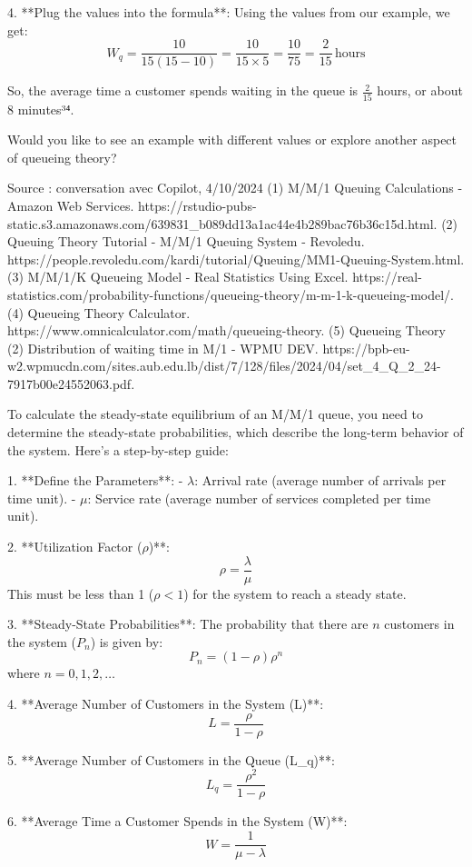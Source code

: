 4. **Plug the values into the formula**: Using the values from our example, we get:
   $$W_q = \frac{10}{15 (15 - 10)} = \frac{10}{15 \times 5} = \frac{10}{75} = \frac{2}{15} \, \text{hours}$$

So, the average time a customer spends waiting in the queue is \(\frac{2}{15}\) hours, or about 8 minutes³⁴.

Would you like to see an example with different values or explore another aspect of queueing theory?

Source : conversation avec Copilot, 4/10/2024
(1) M/M/1 Queuing Calculations - Amazon Web Services. https://rstudio-pubs-static.s3.amazonaws.com/639831_b089dd13a1ac44e4b289bac76b36c15d.html.
(2) Queuing Theory Tutorial - M/M/1 Queuing System - Revoledu. https://people.revoledu.com/kardi/tutorial/Queuing/MM1-Queuing-System.html.
(3) M/M/1/K Queueing Model - Real Statistics Using Excel. https://real-statistics.com/probability-functions/queueing-theory/m-m-1-k-queueing-model/.
(4) Queueing Theory Calculator. https://www.omnicalculator.com/math/queueing-theory.
(5) Queueing Theory (2) Distribution of waiting time in M/1 - WPMU DEV. https://bpb-eu-w2.wpmucdn.com/sites.aub.edu.lb/dist/7/128/files/2024/04/set_4_Q_2_24-7917b00e24552063.pdf.



To calculate the steady-state equilibrium of an M/M/1 queue, you need to determine the steady-state probabilities, which describe the long-term behavior of the system. Here’s a step-by-step guide:

1. **Define the Parameters**:
   - \(\lambda\): Arrival rate (average number of arrivals per time unit).
   - \(\mu\): Service rate (average number of services completed per time unit).

2. **Utilization Factor (\(\rho\))**:
   $$\rho = \frac{\lambda}{\mu}$$
   This must be less than 1 (\(\rho < 1\)) for the system to reach a steady state.

3. **Steady-State Probabilities**:
   The probability that there are \(n\) customers in the system (\(P_n\)) is given by:
   $$P_n = (1 - \rho) \rho^n$$
   where \(n = 0, 1, 2, \ldots\)

4. **Average Number of Customers in the System (L)**:
   $$L = \frac{\rho}{1 - \rho}$$

5. **Average Number of Customers in the Queue (L_q)**:
   $$L_q = \frac{\rho^2}{1 - \rho}$$

6. **Average Time a Customer Spends in the System (W)**:
   $$W = \frac{1}{\mu - \lambda}$$

